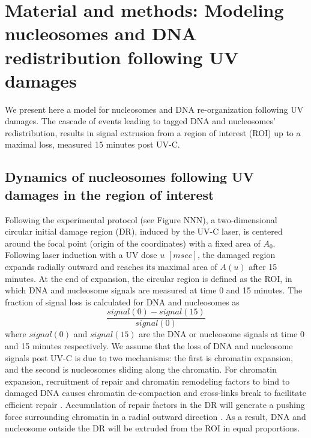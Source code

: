 \documentclass[12pt]{article}
\begin{document}
 \section{Material and methods: Modeling nucleosomes and DNA redistribution following UV damages} 
	
	We present here a model for nucleosomes and DNA re-organization following
	UV damages. The cascade of events leading to tagged DNA and nucleosomes'
	redistribution, results in signal extrusion from a region of interest (ROI) up
	to a maximal loss, measured 15 minutes post UV-C.
	
	\subsection{Dynamics of nucleosomes following UV damages in the region of interest}
	Following the experimental protocol (see Figure NNN), a two-dimensional circular initial damage region (DR), induced by the UV-C laser, is centered around the focal point (origin of the coordinates) with a fixed area of $A_0$. Following
	laser induction with a UV dose $u$ $[msec]$, the damaged region expands radially outward and reaches its maximal area of $A(u)$ after 15 minutes. At the end of expansion, the circular region is defined as the ROI, in which DNA and nucleosome signals are measured at
	time 0 and 15 minutes. The fraction of signal loss is calculated for DNA and nucleosomes as
	\begin{equation*}
	\frac{signal(0)-signal(15)}{signal(0)}
	\end{equation*}	
	where $signal(0)$ and $signal(15)$ are the DNA or nucleosome signals at time 0 and 15 minutes respectively. 
	We assume that the loss of DNA and nucleosome signals post UV-C is due
	to two mechanisms: the first is chromatin expansion, and the second is nucleosomes sliding along the chromatin. For chromatin expansion, recruitment of repair and chromatin remodeling factors to bind to damaged DNA causes chromatin de-compaction and cross-links break \cite{luijsterburg2012ddb2} to facilitate efficient repair \cite{gaillard2003chromatin}. Accumulation of repair factors in the DR will generate a pushing force surrounding chromatin in a radial outward direction \cite{dinant2007activation}. As a result, DNA and nucleosome outside the DR will be extruded from the ROI in equal proportions. 
	
\end{document}
